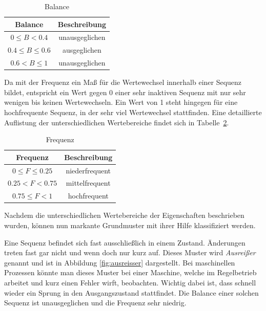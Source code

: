 \begin{table}
	\begin{center}
		\begin{tabular}{|c c|} 
			\hline
			Balance & Beschreibung \\
			\hline\hline
			$0 \leq B < 0.4$ & unausgeglichen \\ 
			\hline
			$0.4 \leq B \leq 0.6$ & ausgeglichen \\
			\hline
			$0.6 < B \leq 1$ & unausgeglichen \\
			\hline
		\end{tabular}
		\caption{Balance}
		\label{tab:balance}
	\end{center}
\end{table}

Da mit der Frequenz ein Maß für die Wertewechsel innerhalb einer Sequenz bildet, entspricht ein Wert gegen 0 einer sehr inaktiven Sequenz mit nur sehr wenigen bis keinen Wertewechseln. Ein Wert von 1 steht hingegen für eine hochfrequente Sequenz, in der sehr viel Wertewechsel stattfinden. Eine detaillierte Auflistung der unterschiedlichen Wertebereiche findet sich in Tabelle~\ref{tab:frequence}. 

\begin{table}
	\begin{center}
		\begin{tabular}{|c c|} 
			\hline
			Frequenz & Beschreibung \\
			\hline\hline
			$0 \leq F \leq 0.25$ & niederfrequent \\ 
			\hline
			$0.25 < F < 0.75$ & mittelfrequent \\
			\hline
			$0.75 \leq F < 1$ & hochfrequent \\
			\hline
		\end{tabular}
		\caption{Frequenz}
		\label{tab:frequence}
	\end{center}
\end{table}

Nachdem die unterschiedlichen Wertebereiche der Eigenschaften beschrieben wurden, können nun markante Grundmuster mit ihrer Hilfe klassifiziert werden.

Eine Sequenz befindet sich fast ausschließlich in einem Zustand. Änderungen treten fast gar nicht und wenn doch nur kurz auf. Dieses Muster wird \textit{Ausreißer} genannt und ist in Abbildung \ref{fig:ausreisser} dargestellt. Bei maschinellen Prozessen könnte man dieses Muster bei einer Maschine, welche im Regelbetrieb arbeitet und kurz einen Fehler wirft, beobachten. Wichtig dabei ist, dass schnell wieder ein Sprung in den Ausgangszustand stattfindet. Die Balance einer solchen Sequenz ist unausgeglichen und die Frequenz sehr niedrig.\\

